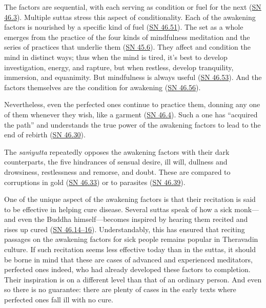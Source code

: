 \documentclass[12pt,openany]{book}%
\begin{document}
The factors are sequential, with each serving as condition or fuel for the next (\href{https://suttacentral.net/sn46.3}{SN 46.3}). Multiple suttas stress this aspect of conditionality. Each of the awakening factors is nourished by a specific kind of fuel (\href{https://suttacentral.net/sn46.51}{SN 46.51}). The set as a whole emerges from the practice of the four kinds of mindfulness meditation and the series of practices that underlie them (\href{https://suttacentral.net/sn45.6}{SN 45.6}). They affect and condition the mind in distinct ways; thus when the mind is tired, it’s best to develop investigation, energy, and rapture, but when restless, develop tranquility, immersion, and equanimity. But mindfulness is always useful (\href{https://suttacentral.net/sn46.53}{SN 46.53}). And the factors themselves are the condition for awakening (\href{https://suttacentral.net/sn46.56}{SN 46.56}).

Nevertheless, even the perfected ones continue to practice them, donning any one of them whenever they wish, like a garment (\href{https://suttacentral.net/sn46.4}{SN 46.4}). Such a one has “acquired the path” and understands the true power of the awakening factors to lead to the end of rebirth (\href{https://suttacentral.net/sn46.30}{SN 46.30}).

The \textit{\textsanskrit{saṁyutta}} repeatedly opposes the awakening factors with their dark counterparts, the five hindrances of sensual desire, ill will, dullness and drowsiness, restlessness and remorse, and doubt. These are compared to corruptions in gold (\href{https://suttacentral.net/sn46.33}{SN 46.33}) or to parasites (\href{https://suttacentral.net/sn46.39}{SN 46.39}).

One of the unique aspect of the awakening factors is that their recitation is said to be effective in helping cure disease. Several suttas speak of how a sick monk—and even the Buddha himself—becomes inspired by hearing them recited and rises up cured (\href{https://suttacentral.net/sn46.14}{SN 46.14–16}). Understandably, this has ensured that reciting passages on the awakening factors for sick people remains popular in Theravadin culture. If such recitation seems less effective today than in the suttas, it should be borne in mind that these are cases of advanced and experienced meditators, perfected ones indeed, who had already developed these factors to completion. Their inspiration is on a different level than that of an ordinary person. And even so there is no guarantee: there are plenty of cases in the early texts where perfected ones fall ill with no cure.
\end{document}
